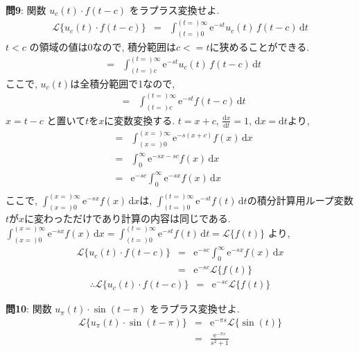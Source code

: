 ﻿\documentclass[a4j]{jarticle}
\begin{document}
\noindent
\large{\bf{問9}}: 関数 \( u_c(t)\cdot f(t-c) \) をラプラス変換せよ.
\begin{eqnarray*}
\mathcal{L} \{ u_c(t)\cdot f(t-c) \} &=& \int_{(t=)0}^{(t=)\infty}{ \mathrm{e}^{-st} u_c(t) \, f(t-c) \, \mathrm{d}t}
\end{eqnarray*}
%
\( t<c \) の領域の値は0なので, 積分範囲は\( c <= t \)に狭めることができる.
%
\begin{eqnarray*}
 &=& \int_{(t=)c}^{(t=)\infty}{ \mathrm{e}^{-st} u_c(t) \, f(t-c) \, \mathrm{d}t}
\end{eqnarray*}
%
ここで, \( u_c(t) \)は全積分範囲で1なので,
%
\begin{eqnarray*}
 &=& \int_{(t=)c}^{(t=)\infty}{ \mathrm{e}^{-st} f(t-c) \, \mathrm{d}t}
\end{eqnarray*}
%
\( x = t-c \) と置いて\(t\)を\(x\)に変数変換する. \( t = x + c ,\, \frac{\mathrm{d}x}{\mathrm{d}t}=1 ,\, \mathrm{d}x = \mathrm{d}t \)より,
%
\begin{eqnarray*}
 &=& \int_{(x=)0}^{(x=)\infty}{ \mathrm{e}^{-s(x+c)} f(x) \, \mathrm{d}x} \\
 &=& \int_0^\infty{ \mathrm{e}^{-sx-sc} f(x) \, \mathrm{d}x} \\
 &=& \mathrm{e}^{-sc} \int_0^\infty{ \mathrm{e}^{-sx} f(x) \, \mathrm{d}x} \\
\end{eqnarray*}
%
ここで,  \( \int_{(x=)0}^{(x=)\infty}{ \mathrm{e}^{-sx} f(x) \, \mathrm{d}x} \)は,
\( \int_{(t=)0}^{(t=)\infty}{ \mathrm{e}^{-st} f(t) \, \mathrm{d}t} \)の積分計算用ループ変数\(t\)が\(x\)に変わっただけであり計算の内容は同じである.
\( \int_{(x=)0}^{(x=)\infty}{ \mathrm{e}^{-sx} f(x) \, \mathrm{d}x} = \int_{(t=)0}^{(t=)\infty}{ \mathrm{e}^{-st} f(t) \, \mathrm{d}t} = \mathcal{L} \{ f(t) \} \) より,
%
\begin{eqnarray*}
\mathcal{L} \{ u_c(t)\cdot f(t-c) \} &=& \mathrm{e}^{-sc} \int_0^\infty{ \mathrm{e}^{-sx} f(x) \, \mathrm{d}x} \\
                                     &=& \mathrm{e}^{-sc} \mathcal{L} \{ f(t) \}
\end{eqnarray*}
%
\begin{eqnarray*}
\therefore \mathcal{L} \{ u_c(t)\cdot f(t-c) \} &=& \mathrm{e}^{-sc} \mathcal{L} \{ f(t) \}
\end{eqnarray*}

\noindent
\large{\bf{問10}}: 関数 \( u_\pi(t)\cdot \sin(t-\pi) \) をラプラス変換せよ.
\begin{eqnarray*}
\mathcal{L} \{ u_\pi(t)\cdot \sin(t-\pi) \} &=& \mathrm{e}^{-\pi s} \mathcal{L} \{ \sin(t) \} \\
                                            &=& \frac{ \mathrm{e}^{-\pi s} }{s^2+1}
\end{eqnarray*}
\end{document}
